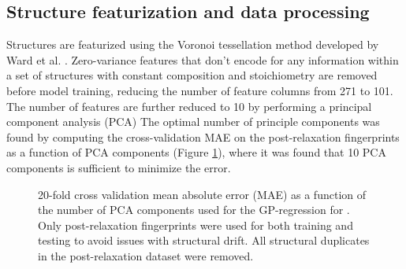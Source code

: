 

\subsection{Structure featurization and data processing}  %
%


%
%
Structures are featurized using the Voronoi tessellation method developed by Ward et al. \cite{Ward2017}.
%
Zero-variance features that don't encode for any information within a set of structures with constant composition and stoichiometry are removed before model training, reducing the number of feature columns from \num{271} to \num{101}.
%
The number of features are further reduced to \num{10} by performing a principal component analysis (PCA)
%
The optimal number of principle components was found by computing the cross-validation MAE on the post-relaxation fingerprints as a function of PCA components (Figure \ref{fig:cv_anal}),
where it was found that 10 PCA components is sufficient to minimize the error.




\begin{figure}[!htb]
\centering
{}
\caption{\label{fig:cv_anal}
20-fold cross validation mean absolute error (MAE) as a function of the number of PCA components used for the GP-regression for \IrOthree. Only post-relaxation fingerprints were used for both training and testing to avoid issues with structural drift. All structural duplicates in the post-relaxation dataset were removed.
}
\end{figure}


